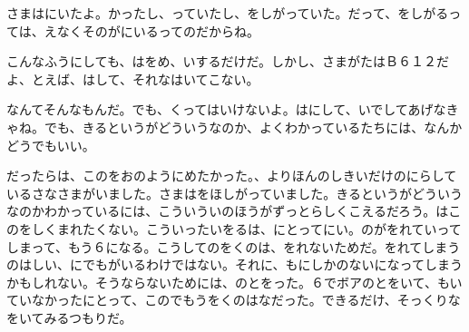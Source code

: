 さまはにいたよ。かったし、っていたし、をしがっていた。だって、をしがるっては、えなくそのがにいるってのだからね。

こんなふうにしても、はをめ、いするだけだ。しかし、さまがたはＢ６１２だよ、とえば、はして、それなはいてこない。

なんてそんなもんだ。でも、くってはいけないよ。はにして、いでしてあげなきゃね。でも、きるというがどういうなのか、よくわかっているたちには、なんかどうでもいい。

だったらは、このをおのようにめたかった。、よりほんのしきいだけのにらしているさなさまがいました。さまはをほしがっていました。きるというがどういうなのかわかっているには、こういういのほうがずっとらしくこえるだろう。はこのをしくまれたくない。こういったいをるは、にとってにい。のがをれていってしまって、もう６になる。こうしてのをくのは、をれないためだ。をれてしまうのはしい、にでもがいるわけではない。それに、もにしかのないになってしまうかもしれない。そうならないためには、のとをった。６でボアのとをいて、もいていなかったにとって、このでもうをくのはなだった。できるだけ、そっくりなをいてみるつもりだ。


